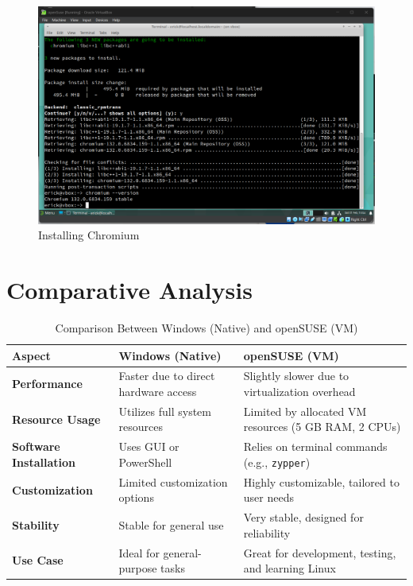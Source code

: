 \documentclass{article}
\begin{document}
\begin{figure}[H]
	\centering
	\includegraphics[width=1\textwidth]{chr.png}
	\caption{Installing Chromium}
	\label{fig:7}
\end{figure}

\section{Comparative Analysis}

\begin{table}[H]
    \centering
    \caption{Comparison Between Windows (Native) and openSUSE (VM)}
    \label{tab:comparison}
    \begin{tabular}{@{}lll@{}}
    \toprule
    \textbf{Aspect} & \textbf{Windows (Native)} & \textbf{openSUSE (VM)} \\
    \midrule
    \textbf{Performance} & Faster due to direct hardware access & Slightly slower due to virtualization overhead \\
    \textbf{Resource Usage} & Utilizes full system resources & Limited by allocated VM resources (5 GB RAM, 2 CPUs) \\
    \textbf{Software Installation} & Uses GUI or PowerShell & Relies on terminal commands (e.g., \texttt{zypper}) \\
    \textbf{Customization} & Limited customization options & Highly customizable, tailored to user needs \\
    \textbf{Stability} & Stable for general use & Very stable, designed for reliability \\
    \textbf{Use Case} & Ideal for general-purpose tasks & Great for development, testing, and learning Linux \\
    \bottomrule
    \end{tabular}
\end{table}
\end{document}
